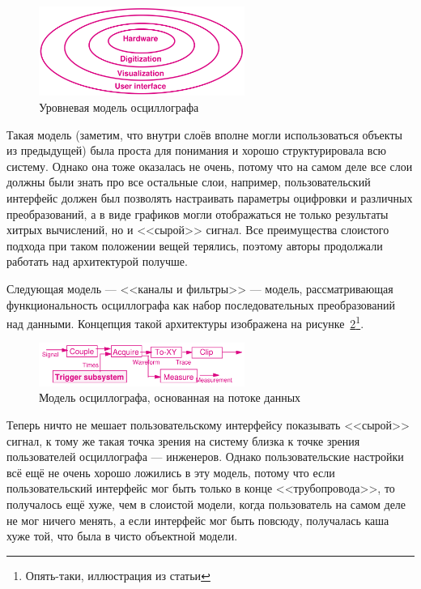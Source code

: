 \documentclass[a5paper]{article}
\begin{document}
\begin{figure}
    \begin{center}
        \includegraphics[width=0.6\textwidth]{oscilloscopeLayers.png}
    \end{center}
    \caption{Уровневая модель осциллографа}
    \label{figure:oscilloscopeLayers}
\end{figure}

Такая модель (заметим, что внутри слоёв вполне могли использоваться объекты из предыдущей) была проста для понимания и хорошо структурировала всю систему. Однако она тоже оказалась не очень, потому что на самом деле все слои должны были знать про все остальные слои, например, пользовательский интерфейс должен был позволять настраивать параметры оцифровки и различных преобразований, а в виде графиков могли отображаться не только результаты хитрых вычислений, но и <<сырой>> сигнал. Все преимущества слоистого подхода при таком положении вещей терялись, поэтому авторы продолжали работать над архитектурой получше.

Следующая модель --- <<каналы и фильтры>> --- модель, рассматривающая функциональность осциллографа как набор последовательных преобразований над данными. Концепция такой архитектуры изображена на рисунке~\ref{figure:oscilloscopeFilters}\footnote{Опять-таки, иллюстрация из статьи}.

\begin{figure}
    \begin{center}
        \includegraphics[width=0.6\textwidth]{oscilloscopeFilters.png}
    \end{center}
    \caption{Модель осциллографа, основанная на потоке данных}
    \label{figure:oscilloscopeFilters}
\end{figure}

Теперь ничто не мешает пользовательскому интерфейсу показывать <<сырой>> сигнал, к тому же такая точка зрения на систему близка к точке зрения пользователей осциллографа --- инженеров. Однако пользовательские настройки всё ещё не очень хорошо ложились в эту модель, потому что если пользовательский интерфейс мог быть только в конце <<трубопровода>>, то получалось ещё хуже, чем в слоистой модели, когда пользователь на самом деле не мог ничего менять, а если интерфейс мог быть повсюду, получалась каша хуже той, что была в чисто объектной модели.
\end{document}
